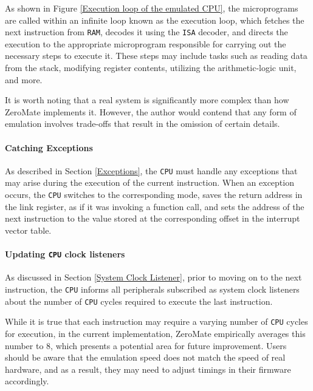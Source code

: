 \documentclass[english, ing, kiv, he, iso690numb, pdf]{fasthesis}
\begin{document}
	
	As shown in Figure \ref{Execution loop of the emulated CPU}, the microprograms are called within an infinite loop known as the execution loop, which fetches the next instruction from \texttt{RAM}, decodes it using the \texttt{ISA} decoder, and directs the execution to the appropriate microprogram responsible for carrying out the necessary steps to execute it. These steps may include tasks such as reading data from the stack, modifying register contents, utilizing the arithmetic-logic unit, and more.
	
	\begin{important}
		It is worth noting that a real system is significantly more complex than how ZeroMate implements it. However, the author would contend that any form of emulation involves trade-offs that result in the omission of certain details.
	\end{important}
	
	\paragraph{Catching Exceptions}
	
	As described in Section \ref{Exceptions}, the \texttt{CPU} must handle any exceptions that may arise during the execution of the current instruction. When an exception occurs, the \texttt{CPU} switches to the corresponding mode, saves the return address in the link register, as if it was invoking a function call, and sets the address of the next instruction to the value stored at the corresponding offset in the interrupt vector table.
	
	\paragraph{Updating \texttt{CPU} clock listeners}
	
	As discussed in Section \ref{System Clock Listener}, prior to moving on to the next instruction, the \texttt{CPU} informs all peripherals subscribed as system clock listeners about the number of \texttt{CPU} cycles required to execute the last instruction.
	
	\begin{important}
		While it is true that each instruction may require a varying number of \texttt{CPU} cycles for execution, in the current implementation, ZeroMate empirically averages this number to 8, which presents a potential area for future improvement. Users should be aware that the emulation speed does not match the speed of real hardware, and as a result, they may need to adjust timings in their firmware accordingly.
	\end{important}
	
\end{document}
